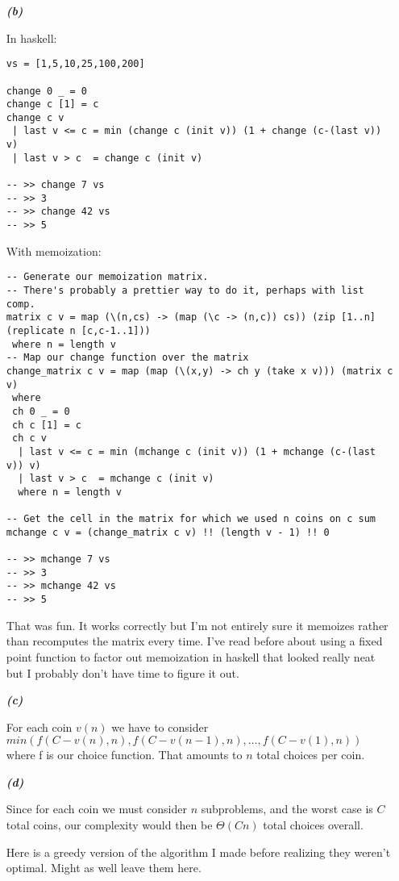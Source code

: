 \documentclass{article}
\begin{document}
\begin{enumerate}
\begin{enumerate}
		\item[\textbf{\emph{(b)}}]

			In haskell:

\begin{verbatim}
vs = [1,5,10,25,100,200]

change 0 _ = 0
change c [1] = c
change c v
 | last v <= c = min (change c (init v)) (1 + change (c-(last v)) v)
 | last v > c  = change c (init v)

-- >> change 7 vs
-- >> 3
-- >> change 42 vs
-- >> 5
\end{verbatim}

			With memoization:

\begin{verbatim}
-- Generate our memoization matrix.
-- There's probably a prettier way to do it, perhaps with list comp.
matrix c v = map (\(n,cs) -> (map (\c -> (n,c)) cs)) (zip [1..n] (replicate n [c,c-1..1]))
 where n = length v
-- Map our change function over the matrix
change_matrix c v = map (map (\(x,y) -> ch y (take x v))) (matrix c v)
 where
 ch 0 _ = 0
 ch c [1] = c
 ch c v
  | last v <= c = min (mchange c (init v)) (1 + mchange (c-(last v)) v)
  | last v > c  = mchange c (init v)
  where n = length v

-- Get the cell in the matrix for which we used n coins on c sum
mchange c v = (change_matrix c v) !! (length v - 1) !! 0

-- >> mchange 7 vs
-- >> 3
-- >> mchange 42 vs
-- >> 5
\end{verbatim}

			That was fun. It works correctly but I'm not entirely sure it memoizes
			rather than recomputes the matrix every time. I've read before about
			using a fixed point function to factor out memoization in haskell that
			looked really neat but I probably don't have time to figure it out.

		\item[\textbf{\emph{(c)}}]

			For each coin $v(n)$ we have to consider $min(f(C-v(n),n), f(C-v(n-1),n),
			\dots, f(C-v(1),n))$ where f is our choice function. That amounts to $n$
			total choices per coin.

		\item[\textbf{\emph{(d)}}]
			
			Since for each coin we must consider $n$ subproblems, and the worst case
			is $C$ total coins, our complexity would then be $\Theta(Cn)$ total
			choices overall.

			Here is a greedy version of the algorithm I made before realizing they
			weren't optimal. Might as well leave them here.


\end{enumerate}
\end{enumerate}
\end{document}
